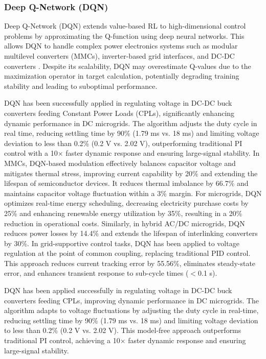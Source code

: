 \subsubsection{Deep Q-Network (DQN)}

Deep Q-Network (DQN) extends value-based RL to high-dimensional control problems by approximating the Q-function using deep neural networks. This allows DQN to handle complex power electronics systems such as modular multilevel converters (MMCs), inverter-based grid interfaces, and DC-DC converters \cite{van2016deep}. Despite its scalability, DQN may overestimate Q-values due to the maximization operator in target calculation, potentially degrading training stability and leading to suboptimal performance.

DQN has been successfully applied in regulating voltage in DC-DC buck converters feeding Constant Power Loads (CPLs), significantly enhancing dynamic performance in DC microgrids. The algorithm adjusts the duty cycle in real time, reducing settling time by 90\% (1.79 ms vs. 18 ms) and limiting voltage deviation to less than 0.2\% (0.2 V vs. 2.02 V), outperforming traditional PI control with a 10$\times$ faster dynamic response and ensuring large-signal stability. In MMCs, DQN-based modulation effectively balances capacitor voltage and mitigates thermal stress, improving current capability by 20\% and extending the lifespan of semiconductor devices. It reduces thermal imbalance by 66.7\% and maintains capacitor voltage fluctuation within a 3\% margin. For microgrids, DQN optimizes real-time energy scheduling, decreasing electricity purchase costs by 25\% and enhancing renewable energy utilization by 35\%, resulting in a 20\% reduction in operational costs. Similarly, in hybrid AC/DC microgrids, DQN reduces power losses by 14.4\% and extends the lifespan of interlinking converters by 30\%. In grid-supportive control tasks, DQN has been applied to voltage regulation at the point of common coupling, replacing traditional PID control. This approach reduces current tracking error by 55.56\%, eliminates steady-state error, and enhances transient response to sub-cycle times ($<$0.1 s).

DQN has been applied successfully in regulating voltage in DC-DC buck converters feeding CPLs, improving dynamic performance in DC microgrids. The algorithm adapts to voltage fluctuations by adjusting the duty cycle in real-time, reducing settling time by 90\% (1.79 ms vs. 18 ms) and limiting voltage deviation to less than 0.2\% (0.2 V vs. 2.02 V). This model-free approach outperforms traditional PI control, achieving a 10$\times$ faster dynamic response and ensuring large-signal stability.

